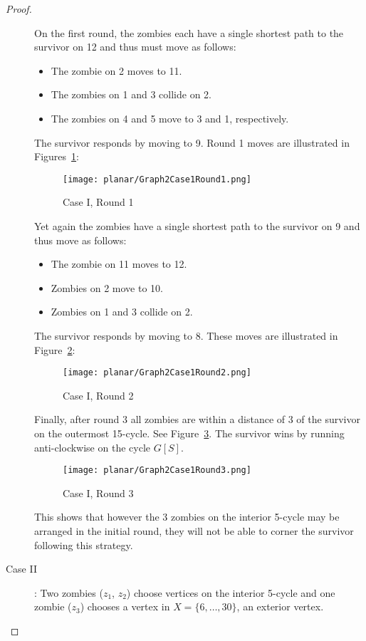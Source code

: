 \begin{proof}
\begin{description}
On the first round, the zombies each have a single shortest path to the survivor on 12 and thus must move as follows:

\begin{itemize}
\item The zombie on 2 moves to 11.
\item The zombies on 1 and 3 collide on 2.
\item The zombies on 4 and 5 move to 3 and 1, respectively.
\end{itemize}

The survivor responds by moving to 9. Round 1 moves are illustrated in Figures~\ref{fig:planarG2C1R1}:
\begin{figure}
\centering
\texttt{[image: planar/Graph2Case1Round1.png]}
\caption{Case I, Round 1\label{fig:planarG2C1R1}}
\end{figure}

Yet again the zombies have a single shortest path to the survivor on 9 and thus move as follows:
\begin{itemize}
\item The zombie on 11 moves to 12.
\item Zombies on 2 move to 10.
\item Zombies on 1 and 3 collide on 2.
\end{itemize}

The survivor responds by moving to 8. These moves are illustrated in Figure~\ref{fig:planarG2C1R2}:
\begin{figure}
\centering
\texttt{[image: planar/Graph2Case1Round2.png]}
\caption{Case I, Round 2\label{fig:planarG2C1R2}}
\end{figure}

Finally, after round 3 all zombies are within a distance of 3 of the survivor on the outermost 15-cycle. See Figure~\ref{fig:planarG2C1R3}. The survivor wins by running anti-clockwise
on the cycle $G[S]$.

\begin{figure}
\centering
\texttt{[image: planar/Graph2Case1Round3.png]}
\caption{Case I, Round 3\label{fig:planarG2C1R3}}
\end{figure}

This shows that however the 3 zombies on the interior 5-cycle may be arranged in the initial round, they will not be able to corner the survivor following this strategy.

\item[Case II \label{planar case 2}]: Two zombies ($z_1$, $z_2$) choose vertices on the interior 5-cycle and one zombie ($z_3$) chooses a vertex in $X = \{ 6, \dots, 30 \}$,
an exterior vertex.


\end{description}
\end{proof}

